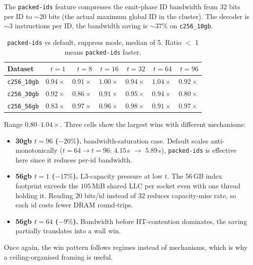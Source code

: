 The \texttt{packed-ids} feature compresses the emit-phase ID bandwidth from $32$ bits per ID to ${\sim}20$ bits (the actual maximum global ID in the cluster). The decoder is $\sim\!3$ instructions per ID, the bandwidth saving is ${\sim}37\%$ on \texttt{c256\_10gb}.

\begin{table}[H]
  \centering
  \caption[\texttt{packed-ids} vs.\ default.]{\texttt{packed-ids} vs default, suppress mode, median of 5. Ratio $<$ 1 means \texttt{packed-ids} faster.}
  \label{tab:packed}
  \begin{tabular}{lrrrrrr}
    \toprule
    Dataset & $t{=}1$ & $t{=}8$ & $t{=}16$ & $t{=}32$ & $t{=}64$ & $t{=}96$ \\
    \midrule
    \texttt{c256\_10gb} & $0.94\times$ & $0.91\times$ & $1.00\times$ & $0.94\times$ & $1.04\times$ & $0.92\times$ \\
    \texttt{c256\_30gb} & $0.92\times$ & $0.86\times$ & $0.91\times$ & $0.95\times$ & $0.94\times$ & $\mathbf{0.80\times}$ \\
    \texttt{c256\_56gb} & $\mathbf{0.83\times}$ & $0.97\times$ & $0.96\times$ & $0.98\times$ & $0.91\times$ & $0.97\times$ \\
    \bottomrule
  \end{tabular}
\end{table}

Range $0.80$--$1.04\times$. Three cells show the largest wins with different mechanisms:

\begin{itemize}
  \item \textbf{30gb $t{=}96$ ($-20\%$).} bandwidth-saturation case. Default scales anti-monotonically ($t{=}64 \rightarrow t{=}96$: $4.15$\,s $\rightarrow$ $5.89$\,s), \texttt{packed-ids} is effective here since it reduces per-id bandwidth.
  \item \textbf{56gb $t{=}1$ ($-17\%$).} L3-capacity pressure at low $t$. The 56\,GB index footprint exceeds the $105$\,MiB shared LLC per socket even with one thread holding it. Reading $20$ bits/id instead of $32$ reduces capacity-miss rate, so each id costs fewer DRAM round-trips.
  \item \textbf{56gb $t{=}64$ ($-9\%$).} Bandwidth before HT-contention dominates, the saving partially translates into a wall win.
\end{itemize}

Once again, the win pattern follows regimes instead of mechanisms, which is why a ceiling-organised framing is useful.

